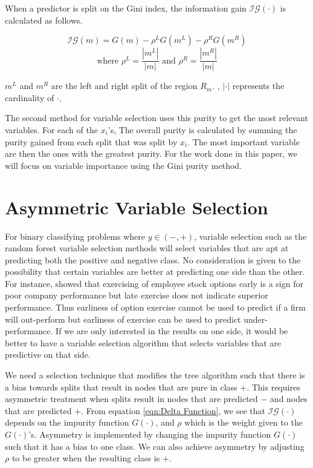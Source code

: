 \documentclass[twoside,11pt]{article}
\begin{document}
When a predictor is split on the Gini index, the information gain $\mathcal{IG}(\cdot)$ is calculated as follows. 

\begin{equation}\label{eqn:Delta Function}
	\mathcal{IG}(m)=G(m)-\rho^L G(m^L)-\rho^R G(m^R) 
\end{equation}
\begin{equation}
	\text{where } \rho^L = \frac{|m^L|}{|m|} \text{ and } \rho^R = \frac{|m^R|}{|m|}
\end{equation}
	



$m^L$ and $m^R$ are the left and right split of the region $R_m$. , $|\cdot|$ represents the cardinality of $\cdot$. 

The second method for variable selection uses this purity to get the most relevant variables. For each of the $x_i$'s, The overall purity is calculated by summing the purity gained from each split that was split by $x_i$. The most important variable are then the ones with the greatest purity. For the work done in this paper, we will focus on variable importance using the Gini purity method. 	

\section{Asymmetric Variable Selection}
For binary classifying problems where $y\in (-,+)$, variable selection such as the random forest variable selection methods will select variables that are apt at predicting both the positive and negative class. No consideration is given to the possibility that certain variables are better at predicting one side than the other. For instance, \cite{Bettis05} showed that exercising of employee stock options early is a sign for poor company performance but late exercise does not indicate superior performance. Thus earliness of option exercise cannot be used to predict if a firm will out-perform but earliness of exercise can be used to predict under-performance. If we are only interested in the results on one side, it would be better to have a variable selection algorithm that selects variables that are predictive on that side. 

We need a selection technique that modifies the tree algorithm such that there is a bias towards splits that result in nodes that are pure in class +. This requires asymmetric treatment when splits result in nodes that are predicted $-$ and nodes that are predicted $+$. From equation \ref{eqn:Delta Function}, we see that $\mathcal{IG}(\cdot)$ depends on the impurity function $G(\cdot)$, and $\rho$ which is the weight given to the $G(\cdot)$'s. Asymmetry is implemented by changing the impurity function $G(\cdot)$ such that it has a bias to one class. We can also achieve asymmetry by adjusting $\rho$ to be greater when the resulting class is $+$. 
\end{document}
